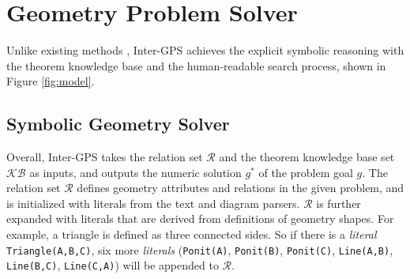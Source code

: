 \documentclass[11pt,a4paper]{article}
\begin{document}


\section{Geometry Problem Solver}
Unlike existing methods \cite{seo2015solving,sachan2017textbooks,alvin2017synthesis,sachan2020discourse}, Inter-GPS achieves the explicit symbolic reasoning with the theorem knowledge base and the human-readable search process, shown in Figure \ref{fig:model}.


\subsection{Symbolic Geometry Solver} \label{sec:symbolic_solver}

Overall, Inter-GPS takes the relation set $\mathcal{R}$ and the theorem knowledge base set $\mathcal{KB}$ as inputs, and outputs the numeric solution $g^*$ of the problem goal $g$. The relation set $\mathcal{R}$ defines geometry attributes and relations in the given problem, and is initialized with literals from the text and diagram parsers.  $\mathcal{R}$ is further expanded with literals that are derived from definitions of geometry shapes. For example, a triangle is defined as three connected sides. So if there is a \textit{literal} \small\texttt{Triangle(A,B,C)}\normalsize, six more \textit{literals} (\small \texttt{Ponit(A)}, \texttt{Ponit(B)}, \texttt{Ponit(C)}, \texttt{Line(A,B)}, \texttt{Line(B,C)}, \texttt{Line(C,A)}\normalsize) will be appended to $\mathcal{R}$.
\end{document}
